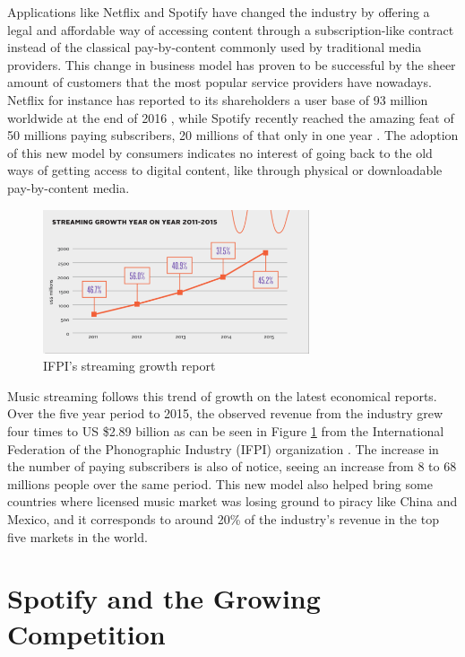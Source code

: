 \documentclass{kththesis}
\begin{document}
	Applications like Netflix and Spotify have changed the industry by offering a legal and affordable way of accessing content through a subscription-like contract instead of the classical pay-by-content commonly used by traditional media providers. This change in business model has proven to be successful by the sheer amount of customers that the most popular service providers have nowadays. Netflix for instance has reported to its shareholders a user base of 93 million worldwide at the end of 2016 \citep{netflixsh}, while Spotify recently reached the amazing feat of 50 millions paying subscribers, 20 millions of that only in one year \citep{spotifypress}. The adoption of this new model by consumers indicates no interest of going back to the old ways of getting access to digital content, like through physical or downloadable pay-by-content media.

	\begin{figure}[h]
    \centering
    \includegraphics[width=0.7\textwidth, natwidth=580bp, natheight=313bp]{figures/ifpi_stream_growth.png}
    \caption{IFPI's streaming growth report}
    \label{fig:ifpi-growth-report}
\end{figure}

	Music streaming follows this trend of growth on the latest economical reports. Over the five year period to 2015, the observed revenue from the industry grew four times to US \$2.89 billion as can be seen in Figure \ref{fig:ifpi-growth-report} from the International Federation of the Phonographic Industry (IFPI) organization \citep{ifpi}. The increase in the number of paying subscribers is also of notice, seeing an increase from 8 to 68 millions people over the same period. This new model also helped bring some countries where licensed music market was losing ground to piracy like China and Mexico, and it corresponds to around 20\% of the industry's revenue in the top five markets in the world. 
	
	\section{Spotify and the Growing Competition}	
	
\end{document}
